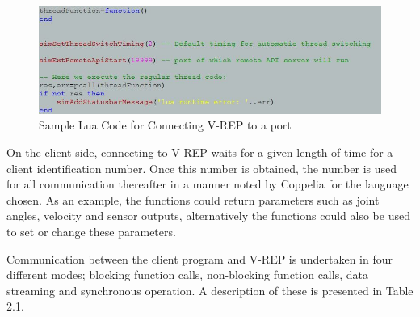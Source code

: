 \documentclass[12pt,openany,a4paper]{book}
\begin{document}
\begin{center}
\begin{figure}[htb]
  \includegraphics[width=\linewidth]{vrep_port_listen.jpg}
\caption{Sample Lua Code for Connecting V-REP to a port}
\end{figure}
\end{center}
On the client side, connecting to V-REP waits for a given length of time for a client identification number. Once this number is obtained, the number is used for all communication thereafter in a manner noted by Coppelia for the language chosen. As an example, the functions could return parameters such as joint angles, velocity and sensor outputs, alternatively the functions could also be used to set or change these parameters.

Communication between the client program and V-REP is undertaken in four different modes; blocking function calls, non-blocking function calls, data streaming and synchronous operation. A description of these is presented in Table 2.1.
\end{document}
